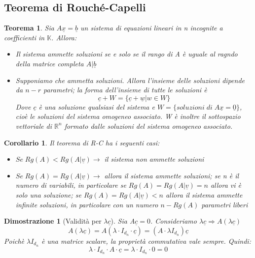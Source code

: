 \documentclass[12pt]{article}
\newenvironment{para}{\begin{adjustwidth}{13mm}{}}{\end{adjustwidth}}
\newtheorem{Corollario}{Corollario}[subsection]
\newtheorem{Teorema}{Teorema}[subsection]
\newtheorem{Dimostrazione}{Dimostrazione}[subsection]
\begin{document}
\begin{para}
\subsection{Teorema di Rouché-Capelli}
\begin{Teorema}
    Sia $A \underline{x} = \underline{b}$ un sistema di equazioni lineari in n incognite a coefficienti in $\mathbb{K}$. Allora:
    \begin{itemize}
        \item Il sistema ammette soluzioni se e solo se il rango di A è uguale al ragndo della matrice completa $A|\underline{b}$
        \item Supponiamo che ammetta soluzioni. Allora l'insieme delle soluzioni dipende da $n-r$ parametri; la forma dell'insieme di tutte le soluzioni è $$\underline{c}+W = \{\underline{c}+\underline{w}|w\in W\}$$ Dove $\underline{c}$ è una soluzione qualsiasi del sistema e $W = \{soluzioni \; di\; A\underline{x} = \underline{0}\}$, cioè le soluzioni del sistema omogeneo associato. W è inoltre il sottospazio vettoriale di $\mathbb{R}^n$ formato dalle soluzioni del sistema omogeneo associato.
    \end{itemize}
\end{Teorema}
\begin{Corollario}
    Il teorema di R-C ha i seguenti casi: \begin{itemize}
        \item $Se \; Rg(A) < Rg(A|\underline{v}) \rightarrow$ il sistema non ammette soluzioni
        \item $Se \; Rg(A) = Rg(A|\underline{v}) \rightarrow$ allora il sistema ammette soluzioni; se n è il numero di variabili, in particolare se $Rg(A) = Rg(A|\underline{v}) = n$ allora vi è solo una soluzione; se $Rg(A) = Rg(A|\underline{v}) < n$ allora il sistema ammette infinite soluzioni, in particolare con un numero $n-Rg(A)$ parametri liberi
    \end{itemize}
\end{Corollario}
\begin{Dimostrazione}[Validità per $\lambda \underline{c}$]
Sia A$\underline{c} = 0$. Consideriamo $\lambda\underline{c} \Rightarrow A(\lambda\underline{c})$
$$A(\lambda\underline{c})=A(\lambda \cdot I_{d_n} \cdot \underline{c}) = (A \cdot \lambda I_{d_n})\underline{c}$$
Poichè $\lambda I_{d_n}$ è una matrice scalare, la proprietà commutativa vale sempre. Quindi:
$$\lambda \cdot I_{d_n} \cdot A \cdot \underline{c} = \lambda \cdot I_{d_n} \cdot 0 = 0$$
\end{Dimostrazione}


\end{para}
\end{document}
